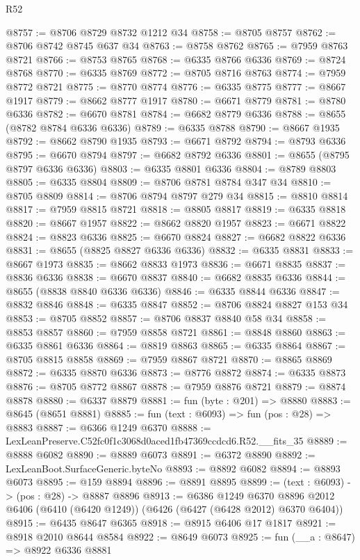 \begin{lexlean}{R52}
\begin{coremodule}
@8757 := @8706 @8729 @8732 @1212 @34
@8758 := @8705 @8757
@8762 := @8706 @8742 @8745 @637 @34
@8763 := @8758 @8762
@8765 := @7959 @8763 @8721
@8766 := @8753 @8765
@8768 := @6335 @8766 @6336
@8769 := @8724 @8768
@8770 := @6335 @8769
@8772 := @8705 @8716 @8763
@8774 := @7959 @8772 @8721
@8775 := @8770 @8774
@8776 := @6335 @8775
@8777 := @8667 @1917
@8779 := @8662 @8777 @1917
@8780 := @6671 @8779
@8781 := @8780 @6336
@8782 := @6670 @8781
@8784 := @6682 @8779 @6336
@8788 := @8655 (@8782 @8784 @6336 @6336)
@8789 := @6335 @8788
@8790 := @8667 @1935
@8792 := @8662 @8790 @1935
@8793 := @6671 @8792
@8794 := @8793 @6336
@8795 := @6670 @8794
@8797 := @6682 @8792 @6336
@8801 := @8655 (@8795 @8797 @6336 @6336)
@8803 := @6335 @8801 @6336
@8804 := @8789 @8803
@8805 := @6335 @8804
@8809 := @8706 @8781 @8784 @347 @34
@8810 := @8705 @8809
@8814 := @8706 @8794 @8797 @279 @34
@8815 := @8810 @8814
@8817 := @7959 @8815 @8721
@8818 := @8805 @8817
@8819 := @6335 @8818
@8820 := @8667 @1957
@8822 := @8662 @8820 @1957
@8823 := @6671 @8822
@8824 := @8823 @6336
@8825 := @6670 @8824
@8827 := @6682 @8822 @6336
@8831 := @8655 (@8825 @8827 @6336 @6336)
@8832 := @6335 @8831
@8833 := @8667 @1973
@8835 := @8662 @8833 @1973
@8836 := @6671 @8835
@8837 := @8836 @6336
@8838 := @6670 @8837
@8840 := @6682 @8835 @6336
@8844 := @8655 (@8838 @8840 @6336 @6336)
@8846 := @6335 @8844 @6336
@8847 := @8832 @8846
@8848 := @6335 @8847
@8852 := @8706 @8824 @8827 @153 @34
@8853 := @8705 @8852
@8857 := @8706 @8837 @8840 @58 @34
@8858 := @8853 @8857
@8860 := @7959 @8858 @8721
@8861 := @8848 @8860
@8863 := @6335 @8861 @6336
@8864 := @8819 @8863
@8865 := @6335 @8864
@8867 := @8705 @8815 @8858
@8869 := @7959 @8867 @8721
@8870 := @8865 @8869
@8872 := @6335 @8870 @6336
@8873 := @8776 @8872
@8874 := @6335 @8873
@8876 := @8705 @8772 @8867
@8878 := @7959 @8876 @8721
@8879 := @8874 @8878
@8880 := @6337 @8879
@8881 := fun (byte : @201) => @8880
@8883 := @8645 (@8651 @8881)
@8885 := fun (text : @6093) => fun (pos : @28) => @8883
@8887 := @6366 @1249 @6370
@8888 := LexLeanPreserve.C52fc0f1c3068d0aced1fb47369ccdcd6.R52.__fits_35
@8889 := @8888 @6082
@8890 := @8889 @6073
@8891 := @6372 @8890
@8892 := LexLeanBoot.SurfaceGeneric.byteNo
@8893 := @8892 @6082
@8894 := @8893 @6073
@8895 := @159 @8894
@8896 := @8891 @8895
@8899 := (text : @6093) -> (pos : @28) -> @8887 @8896
@8913 := @6386
    @1249
    @6370
    @8896
    @2012
    @6406
    (@6410 (@6420 @1249))
    (@6426 (@6427 (@6428 @2012) @6370 @6404))
@8915 := @6435 @8647 @6365
@8918 := @8915 @6406 @17 @1817
@8921 := @8918 @2010 @8644 @8584
@8922 := @8649 @6073
@8925 := fun (__a : @8647) => @8922 @6336 @8881

\end{coremodule}
\end{lexlean}
